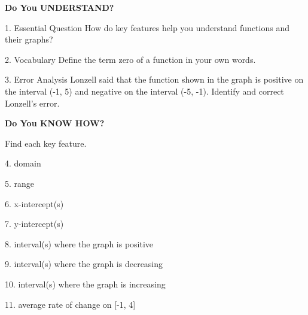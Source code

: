 \documentclass{article}
\newenvironment{concept-summary}{}{}    %
\newcommand{\answer}[1]{}               %
\newcommand{\placeholder}[2]{}          %
\begin{document}
\begin{concept-summary}
\textbf{Do You UNDERSTAND?}

1. Essential Question How do key features help you understand functions and their graphs?
\answer{Key features give you an overall description for the graph. The basic shape is determined by the type of function. Domain and range can give you the orientation as well as finding the x and y intercepts. Knowing intervals where functions are increasing, decreasing, positive and negative also help you graph the function.}

2. Vocabulary Define the term zero of a function in your own words.
\answer{The zeros of a function are the input values that result in a function output value of 0.}

3. Error Analysis Lonzell said that the function shown in the graph is positive on the interval (-1, 5) and negative on the interval (-5, -1). Identify and correct Lonzell's error.

\placeholder{graph}{Red V-shaped graph with arrows on both branches, vertex (-1,-3), x-intercepts (-4,0) and (2,0), and y-intercept (0,-2). Horizontal axis (x) has labeled ticks -4, -2, 0, 2, 4, with visible grid approximately -6 to 6; vertical axis (y) labeled -2, 2, 4, with visible grid approximately -4 to 5. The left branch decreases toward the vertex and the right branch increases.}
\answer{Lonzell confused positive with increasing and negative with decreasing. The function is positive on the intervals (-\infty,-4) and (2,\infty) and negative on the interval (-4,2).}

\textbf{Do You KNOW HOW?}

Find each key feature.

\placeholder{graph}{Graph for Lesson Check 4--11: connected red line segments from an open circle at (-4,1) to (-2,-1), then to (2,3), then to a solid circle at (4,0). Horizontal axis (x) labeled -4, -2, 0, 2, 4; vertical axis (y) labeled 2; unit grid extends approximately -5 to 5 horizontally and -2 to 4 vertically. x-intercepts (-3,0), (-1,0), (4,0); y-intercept (0,1).}

4. domain
\answer{(-4,4]}

5. range
\answer{[-1,3]}

6. x-intercept(s)
\answer{(x=-3), (x=-1), (x=4)}

7. y-intercept(s)
\answer{(y=1)}

8. interval(s) where the graph is positive
\answer{(-4,-3) and (-1,4)}

9. interval(s) where the graph is decreasing
\answer{(-4,-2) and (2,4]}

10. interval(s) where the graph is increasing
\answer{(-2,2)}

11. average rate of change on [-1, 4]
\answer{0}
\end{concept-summary}
\end{document}
